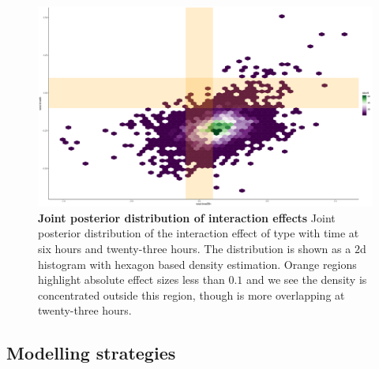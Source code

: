 \documentclass[12pt,english, journal=jpr, layout=twocolumn]{article}
\begin{document}
\begin{figure}[h!]
	\centering
	\includegraphics[width =1\textwidth]{hexbinjointdistribution.pdf}
	\caption{\textbf{Joint posterior distribution of interaction effects} Joint posterior distribution of the interaction effect of type with time at six hours and twenty-three hours. The distribution is shown as a $2$d histogram with hexagon based density estimation. Orange regions highlight absolute effect sizes less than $0.1$ and we see the density is concentrated outside this region, though is more overlapping at twenty-three hours.}
	\label{figure::figure4}
\end{figure}


\subsection{Modelling strategies}
\end{document}
